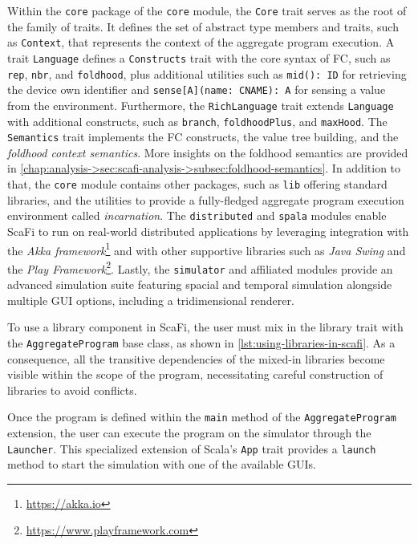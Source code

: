 Within the \texttt{core} package of the \texttt{core} module, the \texttt{Core} trait serves as the root of the family of traits.
%
It defines the set of abstract type members and traits, such as \texttt{Context}, that represents the context of the aggregate program execution.
%
A trait \texttt{Language} defines a \texttt{Constructs} trait with the core syntax of \ac{FC}, such as \texttt{rep}, \texttt{nbr}, and \texttt{foldhood}, plus additional utilities such as \texttt{mid(): ID} for retrieving the device own identifier and \texttt{sense[A](name: CNAME): A} for sensing a value from the environment.
%
Furthermore, the \texttt{RichLanguage} trait extends \texttt{Language} with additional constructs, such as \texttt{branch}, \texttt{foldhoodPlus}, and \texttt{maxHood}.
%
The \texttt{Semantics} trait implements the \ac{FC} constructs, the value tree building, and the \textit{foldhood context semantics}.
%
More insights on the foldhood semantics are provided in \cref{chap:analysis->sec:scafi-analysis->subsec:foldhood-semantics}.
%
In addition to that, the \texttt{core} module contains other packages, such as \texttt{lib} offering standard libraries, and the utilities to provide a fully-fledged aggregate program execution environment called \textit{incarnation}.
%
The \texttt{distributed} and \texttt{spala} modules enable ScaFi to run on real-world distributed applications by leveraging integration with the \textit{Akka framework}\footnote{\url{https://akka.io}} and with other supportive libraries such as \textit{Java Swing} and the \textit{Play Framework}\footnote{\url{https://www.playframework.com}}.
%
Lastly, the \texttt{simulator} and affiliated modules provide an advanced simulation suite featuring spacial and temporal simulation alongside multiple \ac{GUI} options, including a tridimensional renderer.

To use a library component in ScaFi, the user must mix in the library trait with the \texttt{AggregateProgram} base class, as shown in \cref{lst:using-libraries-in-scafi}.
%
As a consequence, all the transitive dependencies of the mixed-in libraries become visible within the scope of the program, necessitating careful construction of libraries to avoid conflicts.



Once the program is defined within the \texttt{main} method of the \texttt{AggregateProgram} extension, the user can execute the program on the simulator through the \texttt{Launcher}.
%
This specialized extension of Scala's \texttt{App} trait provides a \texttt{launch} method to start the simulation with one of the available \acp{GUI}.

